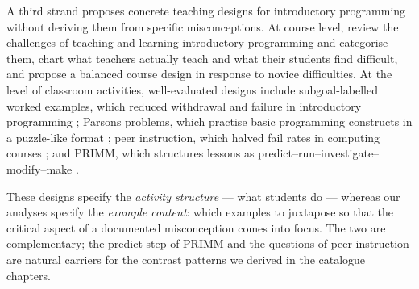 A third strand proposes concrete teaching designs for introductory programming
without deriving them from specific misconceptions. At course level,
\textcite{Medeiros2018SLR} review the challenges of teaching and learning
introductory programming and categorise them, \textcite{Schulte2006TeachersTeach}
chart what teachers actually teach and what their students find difficult, and
\textcite{Miliszewska2007Befriending} propose a balanced course design in
response to novice difficulties. At the level of classroom activities,
well-evaluated designs include subgoal-labelled worked examples, which reduced
withdrawal and failure in introductory programming
\autocite{Margulieux2020Subgoals}; Parsons problems, which practise basic
programming constructs in a puzzle-like format
\autocite{Parsons2006Puzzles}; peer instruction, which halved fail
rates in computing courses \autocite{Porter2013PeerInstruction}; and PRIMM,
which structures lessons as predict--run--investigate--modify--make
\autocite{Sentance2019PRIMM}.

These designs specify the \emph{activity structure} --- what students do ---
whereas our analyses specify the \emph{example content}: which examples to
juxtapose so that the critical aspect of a documented misconception comes into
focus. The two are complementary; the predict step of PRIMM and the questions
of peer instruction are natural carriers for the contrast patterns we derived
in the catalogue chapters.
